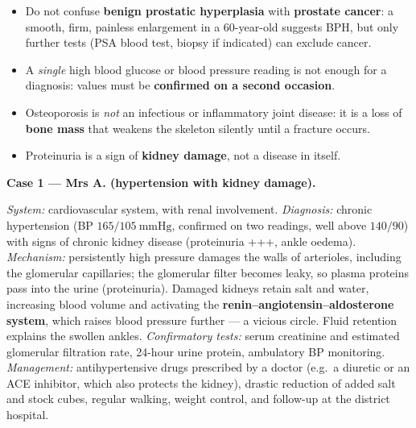 \documentclass[11pt]{article}
\newcommand{\cle}[1]{{\popxbold\color{popdark}#1}}
\newcounter{popsec}
\newcounter{popsub}
\newcommand{\courssub}[1]{%
  \stepcounter{popsub}%
  \par\vspace{9pt}\noindent{\popxbold\fontsize{11.5}{13}\selectfont\color{popink}{\color{poporange}\thepopsec.\thepopsub}\hspace{6pt}#1}\par\nopagebreak\vspace{4pt}
}
\begin{document}
\begin{attention}
\begin{itemize}
\item Do not confuse \textbf{benign prostatic hyperplasia} with \textbf{prostate cancer}: a smooth, firm, painless enlargement in a 60-year-old suggests BPH, but only further tests (PSA blood test, biopsy if indicated) can exclude cancer.
\item A \emph{single} high blood glucose or blood pressure reading is not enough for a diagnosis: values must be \textbf{confirmed on a second occasion}.
\item Osteoporosis is \emph{not} an infectious or inflammatory joint disease: it is a loss of \textbf{bone mass} that weakens the skeleton silently until a fracture occurs.
\item Proteinuria is a sign of \textbf{kidney damage}, not a disease in itself.
\end{itemize}
\end{attention}

\courssub{Model answer}

\textbf{Case 1 — Mrs A. (hypertension with kidney damage).}\par
\emph{System:} cardiovascular system, with renal involvement. \emph{Diagnosis:} chronic \cle{hypertension} (BP $165/105\ \mathrm{mmHg}$, confirmed on two readings, well above $140/90$) with signs of \cle{chronic kidney disease} (proteinuria +++, ankle oedema). \emph{Mechanism:} persistently high pressure damages the walls of arterioles, including the glomerular capillaries; the glomerular filter becomes leaky, so plasma proteins pass into the urine (proteinuria). Damaged kidneys retain salt and water, increasing blood volume and activating the \textbf{renin--angiotensin--aldosterone system}, which raises blood pressure further — a vicious circle. Fluid retention explains the swollen ankles. \emph{Confirmatory tests:} serum creatinine and estimated glomerular filtration rate, 24-hour urine protein, ambulatory BP monitoring. \emph{Management:} antihypertensive drugs prescribed by a doctor (e.g.\ a diuretic or an ACE inhibitor, which also protects the kidney), drastic reduction of added salt and stock cubes, regular walking, weight control, and follow-up at the district hospital.
\end{document}
